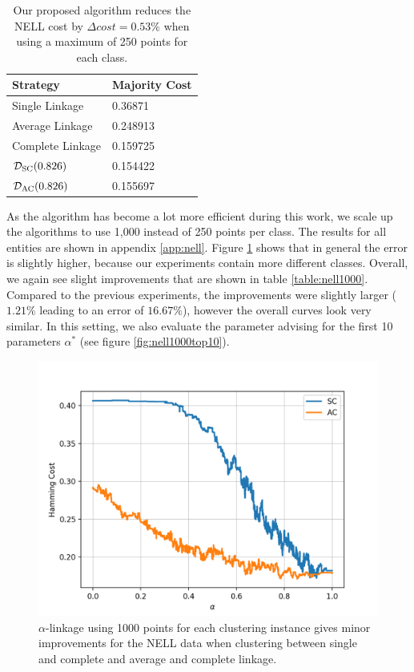 \begin{table}[h]
    \centering
    \begin{tabular}{|l | l|}
    \hline
    Strategy & Majority Cost\\ \hline
    Single Linkage & 0.36871\\
    Average Linkage & 0.248913\\
    Complete Linkage & 0.159725\\
    $\mathcal{D}_\text{SC}(0.826)$ & 0.154422\\
    $\mathcal{D}_\text{AC}(0.826)$ & 0.155697\\\hline
    \end{tabular}
    \caption{Our proposed algorithm reduces the NELL cost by $\Delta cost = 0.53\%$ when using a maximum of 250 points for each class.}
    \label{table:nellresults}
\end{table}

As the algorithm has become a lot more efficient during this work, we scale up the algorithms to use 1,000 instead of 250 points per class. The results for all entities are shown in appendix \ref{app:nell}. Figure \ref{fig:nellresults1000} shows that in general the error is slightly higher, because our experiments contain more different classes. Overall, we again see slight improvements that are shown in table \ref{table:nell1000}. Compared to the previous experiments, the improvements were slightly larger ($1.21\%$ leading to an error of $16.67\%$), however the overall curves look very similar. In this setting, we also evaluate the parameter advising for the first 10 parameters $\alpha^*$ (see figure \ref{fig:nell1000top10}).

\begin{figure}[h]
\centering
  \includegraphics[width=.5\linewidth]{plots/nell_1000}
\caption{$\alpha$-linkage using 1000 points for each clustering instance gives minor improvements for the NELL data when clustering between single and complete and average and complete linkage.}
\label{fig:nellresults1000}
\end{figure}

